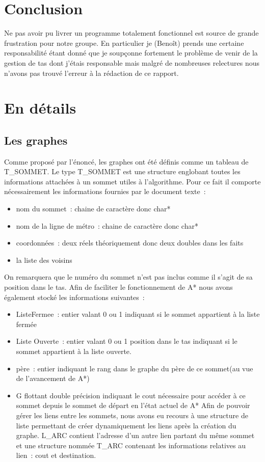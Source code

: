 \documentclass[12pt,a4paper]{article}
\begin{document}
                \section{Conclusion}
                Ne pas avoir pu livrer un programme totalement fonctionnel est source de grande frustration pour notre groupe. En particulier je (Benoît) prends une certaine responsabilité étant donné que je soupçonne fortement le problème de venir de la gestion de tas dont j'étais responsable mais malgré de nombreuses relectures nous n'avons pas trouvé l'erreur à la rédaction de ce rapport.
\section{En détails}
        \subsection{Les graphes}
        Comme proposé par l’énoncé, les graphes ont été définis comme un tableau de T\_SOMMET. Le type T\_SOMMET est une structure englobant toutes les informations attachées à un sommet utiles à l’algorithme. Pour ce fait il comporte nécessairement les informations fournies par le document texte :
        \begin{itemize}
                \item nom du sommet : chaine de caractère donc char*
                \item nom de la ligne de métro : chaine de caractère donc char*
				\item coordonnées : deux réels théoriquement donc deux doubles dans les faits
				\item la liste des voisins
\end{itemize}
On remarquera que le numéro du sommet n’est pas inclus comme il s’agit de sa position dans le tas. Afin de faciliter le fonctionnement de A* nous avons également stocké les informations suivantes :
\begin{itemize}
\item ListeFermee : entier valant 0 ou 1 indiquant si le sommet appartient à la liste fermée
\item Liste Ouverte : entier valant 0 ou 1 position dans le tas indiquant si le sommet appartient à la liste ouverte.
\item père : entier indiquant le rang dans le graphe du père de ce sommet(au vue de l’avancement de A*)
\item G flottant double précision  indiquant le cout nécessaire pour accéder à ce sommet depuis le sommet de départ en l’état actuel de A*
Afin de pouvoir gérer les liens entre les sommets, nous avons eu recours à une structure de liste permettant de créer dynamiquement les liens après la création du graphe. L\_ARC contient l’adresse d’un autre lien partant du même sommet et une structure nommée T\_ARC contenant les informations relatives au lien : cout et destination.
\end{itemize}
\end{document}
